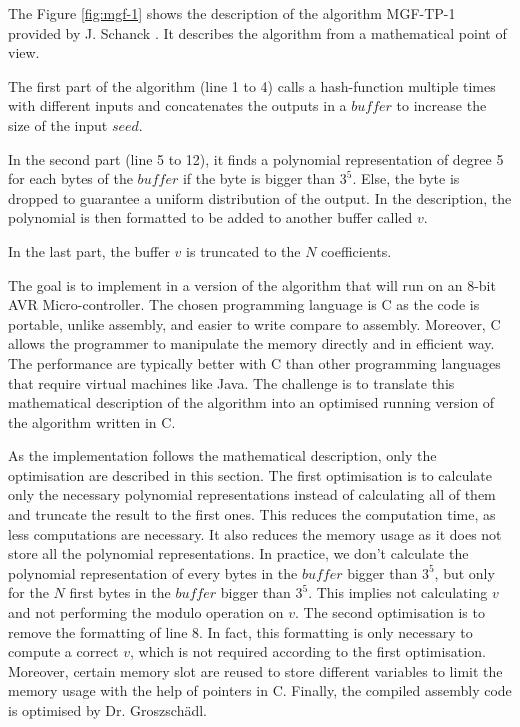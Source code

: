 The Figure \ref{fig:mgf-1} shows the description of the algorithm MGF-TP-1 provided by J. Schanck \cite{schanck_practical_2015}. It describes the algorithm from a mathematical point of view. 

The first part of the algorithm (line 1 to 4) calls a hash-function multiple times with different inputs and concatenates the outputs in a $buffer$ to increase the size of the input $seed$.

In the second part (line 5 to 12), it finds a polynomial representation of degree 5 for each bytes of the $buffer$ if the byte is bigger than $3^5$. Else, the byte is dropped to guarantee a uniform distribution of the output. In the description, the polynomial is then formatted to be added to another buffer called $v$.

In the last part, the buffer $v$ is truncated to the $N$ coefficients.

The goal is to implement in a version of the algorithm that will run on an 8-bit AVR Micro-controller. The chosen programming language is C as the code is portable, unlike assembly, and easier to write compare to assembly. Moreover, C allows the programmer to manipulate the memory directly and in efficient way. The performance are typically better with C than other programming languages that require virtual machines like Java. 
The challenge is to translate this mathematical description of the algorithm into an optimised running version of the algorithm written in C.


As the implementation follows the mathematical description, only the optimisation are described in this section.
The first optimisation is to calculate only the necessary polynomial representations instead of calculating all of them and truncate the result to the first ones. This reduces the computation time, as less computations are necessary. It also reduces the memory usage as it does not store all the polynomial representations. In practice, we don't calculate the polynomial representation of every bytes in the $buffer$ bigger than $3^5$, but only for the $N$ first bytes in the $buffer$ bigger than $3^5$. This implies not calculating $v$ and not performing the modulo operation on $v$. 
The second optimisation is to remove the formatting of line 8. In fact, this formatting is only necessary to compute a correct $v$, which is not required according to the first optimisation.
Moreover, certain memory slot are reused to store different variables to limit the memory usage with the help of pointers in C.
Finally, the compiled assembly code is optimised by Dr. Groszsch\"adl.


